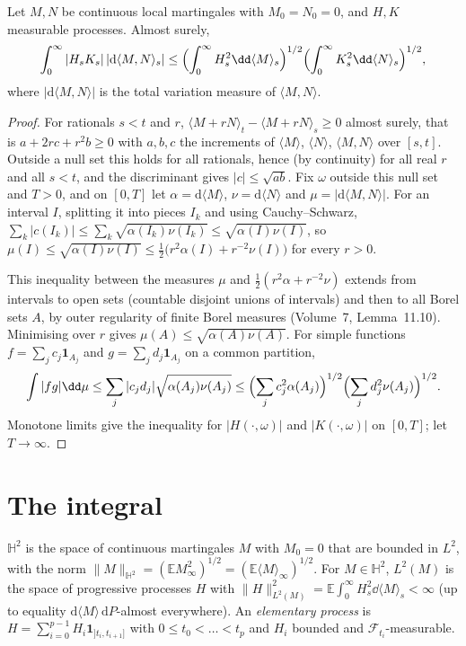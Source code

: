 \begin{lemma}\label{lem:kw}
Let $M,N$ be continuous local martingales with $M_0=N_0=0$, and $H,K$ measurable processes. Almost surely,
\[
\int_0^\infty|H_sK_s|\,|\mathrm d\langle M,N\rangle_s|\le\Bigl(\int_0^\infty H_s^2\dd\langle M\rangle_s\Bigr)^{1/2}\Bigl(\int_0^\infty K_s^2\dd\langle N\rangle_s\Bigr)^{1/2},
\]
where $|\mathrm d\langle M,N\rangle|$ is the total variation measure of $\langle M,N\rangle$.
\end{lemma}

\begin{proof}
For rationals $s<t$ and $r$, $\langle M+rN\rangle_t-\langle M+rN\rangle_s\ge0$ almost surely, that is $a+2rc+r^2b\ge0$ with $a,b,c$ the increments of $\langle M\rangle$, $\langle N\rangle$, $\langle M,N\rangle$ over $[s,t]$.
Outside a null set this holds for all rationals, hence (by continuity) for all real $r$ and all $s<t$, and the discriminant gives $|c|\le\sqrt{ab}$. Fix $\omega$ outside this null set and $T>0$, and on $[0,T]$ let
$\alpha=\mathrm d\langle M\rangle$, $\nu=\mathrm d\langle N\rangle$ and $\mu=|\mathrm d\langle M,N\rangle|$. For an interval $I$, splitting it into pieces $I_k$ and using Cauchy--Schwarz,
$\sum_k|c(I_k)|\le\sum_k\sqrt{\alpha(I_k)\nu(I_k)}\le\sqrt{\alpha(I)\nu(I)}$, so $\mu(I)\le\sqrt{\alpha(I)\nu(I)}\le\frac12\bigl(r^2\alpha(I)+r^{-2}\nu(I)\bigr)$ for every $r>0$.

This inequality between the measures $\mu$ and $\frac12(r^2\alpha+r^{-2}\nu)$ extends from intervals to open sets (countable disjoint unions of intervals) and then to all Borel sets $A$, by outer regularity of finite
Borel measures (Volume~7, Lemma~11.10). Minimising over $r$ gives $\mu(A)\le\sqrt{\alpha(A)\nu(A)}$. For simple functions $f=\sum_jc_j\mathbf 1_{A_j}$ and $g=\sum_jd_j\mathbf 1_{A_j}$ on a common partition,
\[
\int|fg|\dd\mu\le\sum_j|c_jd_j|\sqrt{\alpha(A_j)\nu(A_j)}\le\Bigl(\sum_jc_j^2\alpha(A_j)\Bigr)^{1/2}\Bigl(\sum_jd_j^2\nu(A_j)\Bigr)^{1/2}.
\]
Monotone limits give the inequality for $|H(\cdot,\omega)|$ and $|K(\cdot,\omega)|$ on $[0,T]$; let $T\to\infty$.
\end{proof}

\section{The integral}

\begin{definition}\label{def:H2}
$\mathbb H^2$ is the space of continuous martingales $M$ with $M_0=0$ that are bounded in $L^2$, with the norm $\|M\|_{\mathbb H^2}=(\mathbb EM_\infty^2)^{1/2}=(\mathbb E\langle M\rangle_\infty)^{1/2}$. For $M\in\mathbb H^2$,
$L^2(M)$ is the space of progressive processes $H$ with $\|H\|^2_{L^2(M)}=\mathbb E\int_0^\infty H_s^2\dd\langle M\rangle_s<\infty$ (up to equality $\mathrm d\langle M\rangle\,\mathrm dP$-almost everywhere). An \emph{elementary process}
is $H=\sum_{i=0}^{p-1}H_i\mathbf 1_{]t_i,t_{i+1}]}$ with $0\le t_0<\dots<t_p$ and $H_i$ bounded and $\mathcal F_{t_i}$-measurable.
\end{definition}

